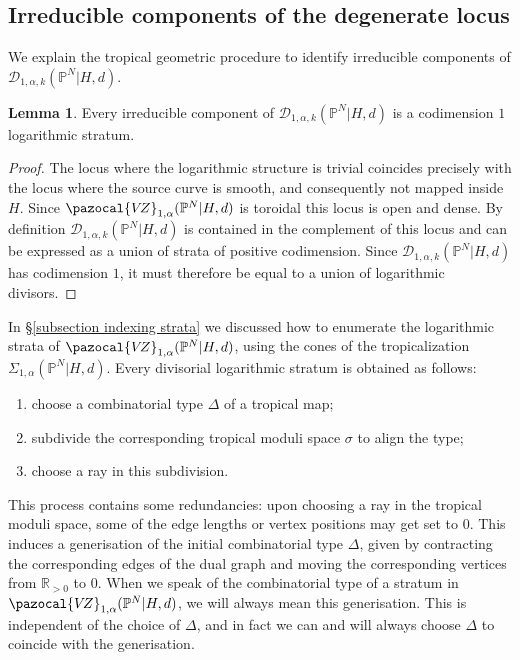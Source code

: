 \documentclass[11pt]{amsart}
\newcommand{\PP}{\mathbb P}
\newcommand{\VZ}{\pazocal{V\!Z}}
\newcommand{\Dcal}{\mathcal{D}}
\newcommand{\RR}{\mathbb{R}}
\theoremstyle{definition}
\newtheorem{lemma}[thm]{Lemma}
\theoremstyle{definition}
\begin{document}
\subsection{Irreducible components of the degenerate locus} We explain the tropical geometric procedure to identify irreducible components of $\Dcal_{1,\alpha,k}(\PP^N|H,d)$.

\begin{lemma} \label{Lemma components are logarithmic divisors} Every irreducible component of $\Dcal_{1,\alpha,k}(\PP^N|H,d)$ is a codimension $1$ logarithmic stratum.\end{lemma}

\begin{proof} The locus where the logarithmic structure is trivial coincides precisely with the  locus where the source curve is smooth, and consequently not mapped inside $H$. Since $\VZ_{1,\alpha}(\PP^N|H,d)$ is toroidal this locus is open and dense. By definition $\Dcal_{1,\alpha,k}(\PP^N|H,d)$ is contained in the  complement of this locus and can be expressed as a union of strata of positive codimension. Since $\Dcal_{1,\alpha,k}(\PP^N|H,d)$ has codimension $1$, it must therefore be equal to a union of logarithmic divisors.\end{proof}

In \S \ref{subsection indexing strata} we discussed how to enumerate the logarithmic strata of $\VZ_{1,\alpha}(\PP^N|H,d)$, using the cones of the tropicalization $\Sigma_{1,\alpha}(\PP^N|H,d)$. Every divisorial logarithmic stratum is obtained as follows:
\begin{enumerate}
\item choose a combinatorial type $\Delta$ of a tropical map;
\item subdivide the corresponding tropical moduli space $\sigma$ to align the type;
\item choose a ray in this subdivision.
\end{enumerate}
This process contains some redundancies: upon choosing a ray in the tropical moduli space, some of the edge lengths or vertex positions may get set to $0$. This induces a generisation of the initial combinatorial type $\Delta$, given by contracting the corresponding edges of the dual graph and moving the corresponding vertices from $\RR_{>0}$ to $0$. When we speak of the combinatorial type of a stratum in $\VZ_{1,\alpha}(\PP^N|H,d)$, we will always mean this generisation. This is independent of the choice of $\Delta$, and in fact we can and will always choose $\Delta$ to coincide with the generisation.
\end{document}
